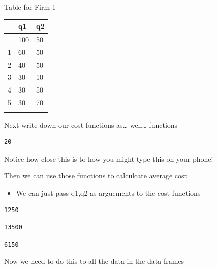 \documentclass[
  ignorenonframetext,
]{beamer}
\providecommand{\tightlist}{%
  \setlength{\itemsep}{0pt}\setlength{\parskip}{0pt}}\usepackage{longtable,booktabs,array}
\begin{document}
\begin{frame}{Table for Firm 1}
\label{table-for-firm-1}
\pause

\begin{longtable}[]{@{}lll@{}}
\toprule\noalign{}
& q1 & q2 \\
\midrule\noalign{}
\endhead
0 & 100 & 50 \\
1 & 60 & 50 \\
2 & 40 & 50 \\
3 & 30 & 10 \\
4 & 30 & 50 \\
5 & 30 & 70 \\
\bottomrule\noalign{}
\end{longtable}
\end{frame}

\begin{frame}[fragile]
\begin{block}{Next write down our cost functions as\ldots{} well\ldots{}
functions}
\label{next-write-down-our-cost-functions-as-well-functions}
\pause

\begin{verbatim}
20
\end{verbatim}

\pause

Notice how close this is to how you might type this on your phone!
\end{block}
\end{frame}

\begin{frame}[fragile]
\begin{block}{Then we can use those functions to calculcate average
cost}
\label{then-we-can-use-those-functions-to-calculcate-average-cost}
\begin{itemize}
\tightlist
\item
  We can just pass q1,q2 as arguements to the cost functions
\end{itemize}

\begin{verbatim}
1250
\end{verbatim}

\begin{verbatim}
13500
\end{verbatim}

\begin{verbatim}
6150
\end{verbatim}

\pause

Now we need to do this to all the data in the data frames
\end{block}
\end{frame}
\end{document}
